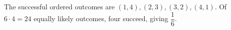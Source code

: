 The successful ordered outcomes are $(1,4),(2,3),(3,2),(4,1)$. Of $6\cdot4=24$ equally likely outcomes, four succeed, giving $\boxed{\dfrac{1}{6}}$.
